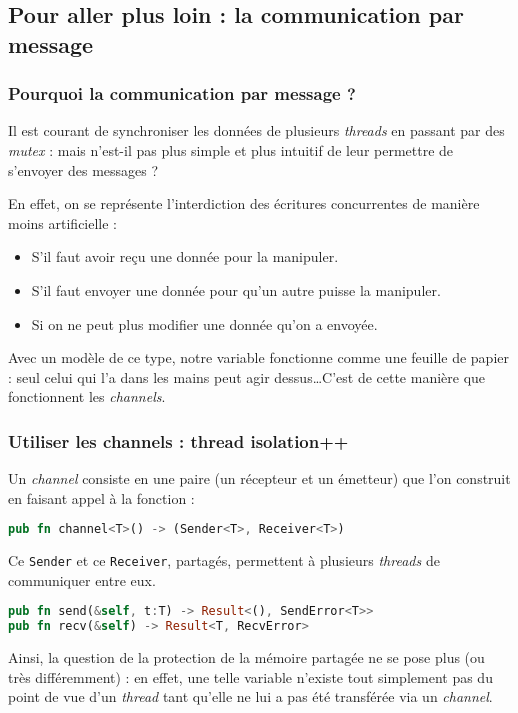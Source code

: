 \subsection{Pour aller plus loin : la communication par message}
\begin{frame}
  \frametitle{Pourquoi la communication par message ?}
  Il est courant de synchroniser les données de plusieurs \textit{threads} en passant par des \textit{mutex} : mais n'est-il pas plus simple et plus intuitif de leur permettre de s'envoyer des messages ?

En effet, on se représente l'interdiction des écritures concurrentes de manière moins artificielle :
\begin{itemize}
\item  S'il faut avoir reçu une donnée pour la manipuler.
\item  S'il faut envoyer une donnée pour qu'un autre puisse la manipuler.
\item  Si on ne peut plus modifier une donnée qu'on a envoyée.
\end{itemize}

Avec un modèle de ce type, notre variable fonctionne comme une feuille de papier : seul celui qui l'a dans les mains peut agir dessus\dots C'est de cette manière que fonctionnent les \textit{channels}.
\end{frame}

\begin{frame}[fragile]
  \frametitle{Utiliser les channels : thread isolation++}
  Un \textit{channel} consiste en une paire (un récepteur et un émetteur) que l'on construit en faisant appel à la fonction :
  \begin{lstlisting}[language=rust]
pub fn channel<T>() -> (Sender<T>, Receiver<T>)
  \end{lstlisting}
  Ce \texttt{Sender} et ce \texttt{Receiver}, partagés, permettent à plusieurs \textit{threads} de communiquer entre eux.
  \begin{lstlisting}[language=rust]
pub fn send(&self, t:T) -> Result<(), SendError<T>>
pub fn recv(&self) -> Result<T, RecvError>
  \end{lstlisting}

Ainsi, la question de la protection de la mémoire partagée ne se pose plus (ou très différemment) : en effet, une telle variable n'existe tout simplement pas du point de vue d'un \textit{thread} tant qu'elle ne lui a pas été transférée via un \textit{channel}.
\end{frame}

